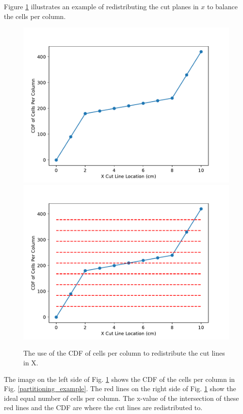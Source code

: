 Figure \ref{redistribute} illustrates an example of redistributing the cut planes in $x$ to balance the cells per column.
\begin{figure}[H]
\centering
\includegraphics[scale=0.4]{../figures/spiderweb_redistribute_before_sparse.pdf}
\includegraphics[scale=0.4]{../figures/spiderweb_redistribute_after_sparse.pdf}
\caption{The use of the CDF of cells per column to redistribute the cut lines in X.}
\label{redistribute}
\end{figure}
The image on the left side of Fig. \ref{redistribute} shows the CDF of the cells per column in Fig. \ref{partitioning_example}. The red lines on the right side of Fig. \ref{redistribute} show the ideal equal number of cells per column. The x-value of the intersection of these red lines and the CDF are where the cut lines are redistributed to.


